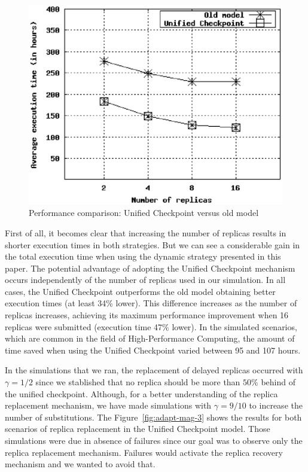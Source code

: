 \documentclass{cpeauth}
\begin{document}
\begin{figure}[th]
\centering \includegraphics[width=.5\columnwidth]{images/49-55_scenario.eps}
\caption{Performance comparison: Unified Checkpoint versus old model}
\label{fig:adapt-mag}
\end{figure}
%

First of all, it becomes clear that increasing the number of replicas results
in shorter execution times in both strategies. But we can see a considerable
gain in the total execution time when using the dynamic strategy presented in
this paper. The potential advantage of adopting the Unified Checkpoint
mechanism occurs independently of the number of replicas used in our
simulation. In all cases, the Unified Checkpoint outperforms the old model
obtaining better execution times (at least 34\% lower). This difference
increases as the number of replicas increases, achieving its maximum
performance improvement when 16 replicas were submitted (execution time 47\%
lower). In the simulated scenarios, which are common in the field of
High-Performance Computing, the amount of time saved when using the Unified
Checkpoint varied between 95 and 107 hours.

In the simulations that we ran, the replacement of delayed replicas occurred
with $\gamma = 1/2$ since we stablished that no replica should be more than
$50\%$ behind of the unified checkpoint. Although, for a better understanding
of the replica replacement mechanism, we have made simulations with $\gamma =
9/10$ to increase the number of substitutions. The Figure~\ref{fig:adapt-mag-3}
shows the results for both scenarios of replica replacement in the Unified
Checkpoint model. Those simulations were due in absence of failures since our
goal was to observe only the replica replacement mechanism. Failures would
activate the replica recovery mechanism and we wanted to avoid that.
\end{document}
